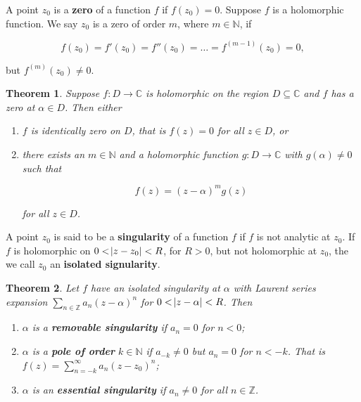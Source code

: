 \documentclass{article}
\newtheorem{theorem}{Theorem}[section]
\theoremstyle{definition}
\theoremstyle{remark}
\begin{document}
A point $z_0$ is a \textbf{zero} of a function $f$ if $f(z_0)=0$. Suppose $f$ is a holomorphic function. We say $z_0$ is a zero of order $m$, where $m\in\mathbb{N}$, if 

\begin{equation*}
    f(z_0)=f'(z_0)=f''(z_0)=\dots=f^{(m-1)}(z_0)=0, 
\end{equation*}

\noindent but $f^{(m)}(z_0)\neq 0$. 

\newpage

\begin{theorem}
    Suppose $f\colon D\rightarrow\mathbb{C}$ is holomorphic on the region $D\subseteq\mathbb{C}$ and $f$ has a zero at $\alpha\in D$. Then either
    
    \begin{enumerate}[label=(\alph*)]
        \item $f$ is identically zero on $D$, that is $f(z)=0$ for all $z\in D$, or
        \item there exists an $m\in\mathbb{N}$ and a holomorphic function $g\colon D\rightarrow\mathbb{C}$ with $g(\alpha)\neq 0$ such that
        
        \begin{equation*}
            f(z)=(z-\alpha)^mg(z)
        \end{equation*}
        
        \noindent for all $z\in D$.
    \end{enumerate}
\end{theorem}

\noindent A point $z_0$ is said to be a \textbf{singularity} of a function $f$ if $f$ is not analytic at $z_0$. If $f$ is holomorphic on $0<\abs{z-z_0}<R$, for $R>0$, but not holomorphic at $z_0$, the we call $z_0$ an \textbf{isolated signularity}. 

\begin{theorem}
    Let $f$ have an isolated singularity at $\alpha$ with Laurent series expansion $\sum\limits_{n\in\mathbb{Z}}a_n(z-\alpha)^n$ for $0<\abs{z-\alpha}<R$. Then 
    
    \begin{enumerate}[label=(\roman*)]
        \item $\alpha$ is a \textbf{removable singularity} if $a_n=0$ for $n<0$;
        \item $\alpha$ is a \textbf{pole of order} $k\in\mathbb{N}$ if $a_{-k}\neq0$ but $a_n=0$ for $n<-k$. That is $f(z)=\sum_{n=-k}^{\infty}a_n(z-z_0)^n$;
        \item $\alpha$ is an \textbf{essential singularity} if $a_n\neq 0$ for all $n\in\mathbb{Z}$. 
    \end{enumerate}
\end{theorem}
\end{document}
